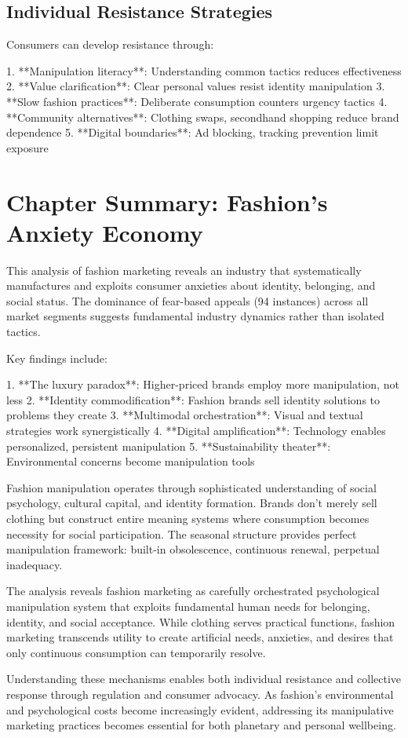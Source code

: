 \subsection{Individual Resistance Strategies}

Consumers can develop resistance through:

1. **Manipulation literacy**: Understanding common tactics reduces effectiveness
2. **Value clarification**: Clear personal values resist identity manipulation
3. **Slow fashion practices**: Deliberate consumption counters urgency tactics
4. **Community alternatives**: Clothing swaps, secondhand shopping reduce brand dependence
5. **Digital boundaries**: Ad blocking, tracking prevention limit exposure

\section{Chapter Summary: Fashion's Anxiety Economy}
\label{sec:fashion_summary}

This analysis of fashion marketing reveals an industry that systematically manufactures and exploits consumer anxieties about identity, belonging, and social status. The dominance of fear-based appeals (94 instances) across all market segments suggests fundamental industry dynamics rather than isolated tactics.

Key findings include:

1. **The luxury paradox**: Higher-priced brands employ more manipulation, not less
2. **Identity commodification**: Fashion brands sell identity solutions to problems they create
3. **Multimodal orchestration**: Visual and textual strategies work synergistically
4. **Digital amplification**: Technology enables personalized, persistent manipulation
5. **Sustainability theater**: Environmental concerns become manipulation tools

Fashion manipulation operates through sophisticated understanding of social psychology, cultural capital, and identity formation. Brands don't merely sell clothing but construct entire meaning systems where consumption becomes necessity for social participation. The seasonal structure provides perfect manipulation framework: built-in obsolescence, continuous renewal, perpetual inadequacy.

The analysis reveals fashion marketing as carefully orchestrated psychological manipulation system that exploits fundamental human needs for belonging, identity, and social acceptance. While clothing serves practical functions, fashion marketing transcends utility to create artificial needs, anxieties, and desires that only continuous consumption can temporarily resolve.

Understanding these mechanisms enables both individual resistance and collective response through regulation and consumer advocacy. As fashion's environmental and psychological costs become increasingly evident, addressing its manipulative marketing practices becomes essential for both planetary and personal wellbeing.